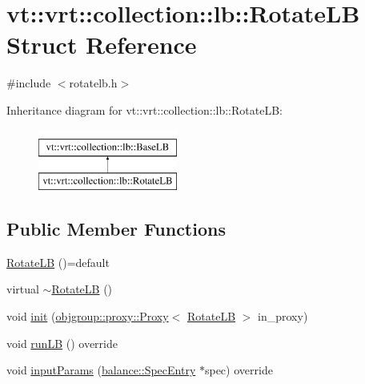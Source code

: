\hypertarget{structvt_1_1vrt_1_1collection_1_1lb_1_1_rotate_l_b}{}\section{vt\+:\+:vrt\+:\+:collection\+:\+:lb\+:\+:Rotate\+LB Struct Reference}
\label{structvt_1_1vrt_1_1collection_1_1lb_1_1_rotate_l_b}


{\ttfamily \#include $<$rotatelb.\+h$>$}

Inheritance diagram for vt\+:\+:vrt\+:\+:collection\+:\+:lb\+:\+:Rotate\+LB\+:\begin{figure}[H]
\begin{center}
\leavevmode
\includegraphics[height=2.000000cm]{structvt_1_1vrt_1_1collection_1_1lb_1_1_rotate_l_b}
\end{center}
\end{figure}
\subsection*{Public Member Functions}
\begin{DoxyCompactItemize}
\item 
\hyperlink{structvt_1_1vrt_1_1collection_1_1lb_1_1_rotate_l_b_a9cb675c68ec8794d6a2e284ece5de8a8}{Rotate\+LB} ()=default
\item 
virtual \hyperlink{structvt_1_1vrt_1_1collection_1_1lb_1_1_rotate_l_b_ae2a8e40cf47a9ea3be9d4ec6f44d9f50}{$\sim$\+Rotate\+LB} ()
\item 
void \hyperlink{structvt_1_1vrt_1_1collection_1_1lb_1_1_rotate_l_b_a2f0126b5029e1348b86089470ffcd4f2}{init} (\hyperlink{structvt_1_1objgroup_1_1proxy_1_1_proxy}{objgroup\+::proxy\+::\+Proxy}$<$ \hyperlink{structvt_1_1vrt_1_1collection_1_1lb_1_1_rotate_l_b}{Rotate\+LB} $>$ in\+\_\+proxy)
\item 
void \hyperlink{structvt_1_1vrt_1_1collection_1_1lb_1_1_rotate_l_b_a853cb29e5dbe8164ad96a33fade9cc44}{run\+LB} () override
\item 
void \hyperlink{structvt_1_1vrt_1_1collection_1_1lb_1_1_rotate_l_b_a70fc0a77f387632fc57805950b63f443}{input\+Params} (\hyperlink{structvt_1_1vrt_1_1collection_1_1balance_1_1_spec_entry}{balance\+::\+Spec\+Entry} $\ast$spec) override
\end{DoxyCompactItemize}
